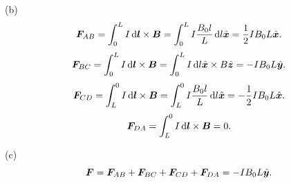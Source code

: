 \documentclass{article}
\begin{document}
\begin{solution}
  (b) 
  \[ 
    \boldsymbol{F}_{AB}
    =\int_{0}^{L} I\,\mathrm{d}\boldsymbol{l}\times\boldsymbol{B}
    =\int_{0}^{L}I\frac{B_0 l}{L}\,\mathrm{d} l\hat{\boldsymbol{x}}
    =\frac{1}{2}IB_0L\hat{\boldsymbol{x}}. 
  \]
  \quad
  \[
    \boldsymbol{F}_{BC}
    =\int_{0}^{L} I\,\mathrm{d}\boldsymbol{l}\times\boldsymbol{B}
    =\int_{0}^{L} I\,\mathrm{d} l \hat{\boldsymbol{x}}\times B\hat{\boldsymbol{z}} 
    =-IB_0L\hat{\boldsymbol{y}}.
  \]
  \quad
  \[ 
    \boldsymbol{F}_{CD}
    =\int_{L}^{0} I\,\mathrm{d}\boldsymbol{l}\times\boldsymbol{B}
    =\int_{L}^{0} I\frac{B_0 l}{L}\,\mathrm{d} l\hat{\boldsymbol{x}}
    =
    -\frac{1}{2}IB_0L\hat{\boldsymbol{x}}. 
  \]
  \quad
  \[ 
    \boldsymbol{F}_{DA}
    =\int_{L}^{0} I\,\mathrm{d}\boldsymbol{l}\times\boldsymbol{B}
    =0.
  \]
  
  (c)
  \[ \boldsymbol{F} 
  = \boldsymbol{F}_{AB} + \boldsymbol{F}_{BC} + \boldsymbol{F}_{CD} + \boldsymbol{F}_{DA}
  = -IB_0L\hat{\boldsymbol{y}}. \]
\end{solution}
\end{document}
